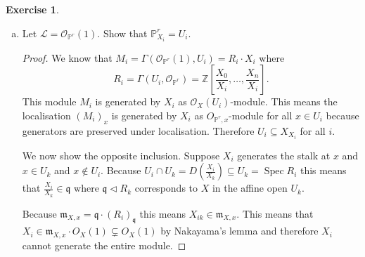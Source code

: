 \documentclass{article}
\newcommand{\Z}{\mathbb{Z}}
\newcommand{\proj}{\mathbb{P}}
\newcommand{\sheaf}{\mathcal{O}}
\newcommand{\maxid}{\mathfrak{m}}
\newcommand{\primeid}{\mathfrak{p}}
\newcommand{\primeidd}{\mathfrak{q}}
\DeclareMathOperator{\spec}{Spec}
\DeclareMathOperator{\supp}{Supp}
\newcommand{\ideal}{\triangleleft}
\theoremstyle{definition}
\newtheorem{question}{Exercise}
\begin{document}
\begin{question}
\begin{enumerate}[(a)]
\begin{proof}
                  Conversely if \(s_{x}\) generates the stalk then
                  \((\sheaf_{X}|_{U_{i}})_{\primeid}/(\sheaf_{X}|_{U_{i}}\cdot
                  s)_\primeid\cong 0\), we can follow the chain of isomorphisms
                  above to get that \((\mathcal{L}/(\sheaf_{X}\cdot
                  s))_{x}\cong0\).

                  This means that \(x\in\supp\mathcal{L}/(\sheaf_{X}\cdot s)\)
                  iff \(s_{x}\) does not generate \(\mathcal{L}_{x}\): i.e.
                  \(X_{s}\) is the complement of the closed set
                  \(\supp\mathcal{L}/(\sheaf_{X}\cdot s)\).
              \end{proof}

        \item Let \(\mathcal{L}=\sheaf_{\proj^{r}}(1)\). Show that
              \(\proj^{r}_{X_{i}}=U_{i}\).

              \begin{proof}
                  We know that \(M_{i}=\Gamma(\sheaf_{\proj^{r}}(1),U_{i})=R_{i}\cdot
                  X_{i}\) where
                  \[
                      R_{i}=\Gamma(U_{i},\sheaf_{\proj^{r}})=\Z\left[\frac{X_{0}}{X_{i}},\ldots,\frac{X_{n}}{X_{i}}\right].
                  \]
                  This module \(M_{i}\) is generated by \(X_{i}\) as
                  \(\sheaf_{X}(U_{i})\)-module. This means the localisation
                  \((M_{i})_{x}\) is generated by \(X_{i}\) as
                  \(O_{\proj^{r},x}\)-module for all \(x\in U_{i}\) because
                  generators are preserved under localisation. Therefore
                  \(U_{i}\subseteq X_{X_{i}}\) for all \(i\).

                  We now show the opposite inclusion. Suppose \(X_{i}\)
                  generates the stalk at \(x\) and \(x\in U_{k}\) and \(x\notin
                  U_{i}\). Because \(U_{i}\cap
                  U_{k}=D\left(\frac{X_{i}}{X_{k}}\right)\subseteq U_{k}=\spec
                  R_{i}\) this means that \(\frac{X_{i}}{X_{k}}\in\primeidd\)
                  where \(\primeidd\ideal R_{k}\) corresponds to \(X\) in the
                  affine open \(U_{k}\).

                  Because \(\maxid_{X,x}=\primeidd\cdot (R_{i})_{\primeidd}\)
                  this means \(X_{ik}\in\maxid_{X,x}\). This means that
                  \(X_{i}\in\maxid_{X,x}\cdot O_{X}(1)\subsetneq O_{X}(1)\) by
                  Nakayama's lemma and therefore \(X_{i}\) cannot generate the
                  entire module.
              \end{proof}
    \end{enumerate}
\end{question}
\end{document}
